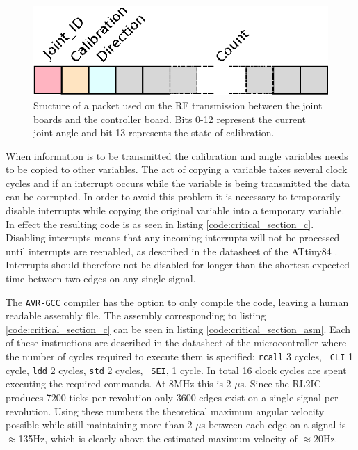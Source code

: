 \begin{figure}[h]
	\centering
	\includegraphics[width=.5\linewidth]{graphics/rf_packet}
	\caption[RF transmission packet used from the joint board.]{Sructure of a packet used on the RF transmission between the joint boards and the controller board. Bits 0-12 represent the current joint angle and bit 13 represents the state of calibration.}
	\label{fig:rfpacket}
\end{figure}

When information is to be transmitted the calibration and angle variables needs to be copied to other variables.
The act of copying a variable takes several clock cycles and if an interrupt occurs while the variable is being transmitted the data can be corrupted.
In order to avoid this problem it is necessary to temporarily disable interrupts while copying the original variable into a temporary variable. 
In effect the resulting code is as seen in listing \ref{code:critical_section_c}.
Disabling interrupts means that any incoming interrupts will not be processed until interrupts are reenabled, as described in the datasheet of the ATtiny84 \cite{attiny84}.
Interrupts should therefore not be disabled for longer than the shortest expected time between two edges on any single signal.

The \texttt{AVR-GCC} compiler has the option to only compile the code, leaving a human readable assembly file.
The assembly corresponding to listing \ref{code:critical_section_c} can be seen in listing \ref{code:critical_section_asm}.
Each of these instructions are described in the datasheet of the microcontroller where the number of cycles required to execute them is specified: \texttt{rcall} 3 cycles, \texttt{\_CLI} 1 cycle, \texttt{ldd} 2 cycles, \texttt{std} 2 cycles, \texttt{\_SEI}, 1 cycle.
In total 16 clock cycles are spent executing the required commands.
At 8MHz this is 2 $\mu$s.
Since the RL2IC produces 7200 ticks per revolution only 3600 edges exist on a single signal per revolution. 
Using these numbers the theoretical maximum angular velocity possible while still maintaining more than 2 $\mu$s between each edge on a signal is $\approx$135Hz, which is clearly above the estimated maximum velocity of $\approx$20Hz.

